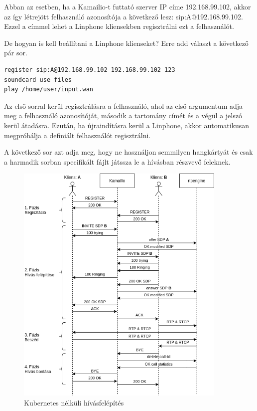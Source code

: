 Abban az esetben, ha a Kamailio-t futtató szerver IP címe 192.168.99.102, akkor az 
így létrejött felhasználó azonosítója a következő lesz: sip:A@192.168.99.102. Ezzel a
címmel lehet a Linphone kliensekben regisztrálni ezt a felhasználót. 

De hogyan is kell beállítani a Linphone klienseket? Erre add választ a következő 
pár sor. 

\begin{lstlisting}[caption=Linphone beállítása, label=lst:setupLinphone]
register sip:A@192.168.99.102 192.168.99.102 123
soundcard use files
play /home/user/input.wan
\end{lstlisting}

Az első sorral kerül regisztrálásra a felhasználó, ahol az első argumentum adja meg a 
felhasználó azonosítóját, második a tartomány címét és a végül a jelszó kerül átadásra. 
Ezután, ha újraindításra kerül a Linphone, akkor automatikusan megpróbálja a definiált
felhasználót regisztrálni. 

A következő sor azt adja meg, hogy ne használjon semmilyen hangkártyát és csak a 
harmadik sorban specifikált fájlt játssza le a hívásban részvevő feleknek.  \\

\begin{figure}[!ht]
	\centering
	\includegraphics[width=0.9\textwidth, keepaspectratio]{figures/basic_call_flow.png}
	\caption{Kubernetes nélküli hívásfelépítés}
	\label{fig:callflow}
\end{figure}

